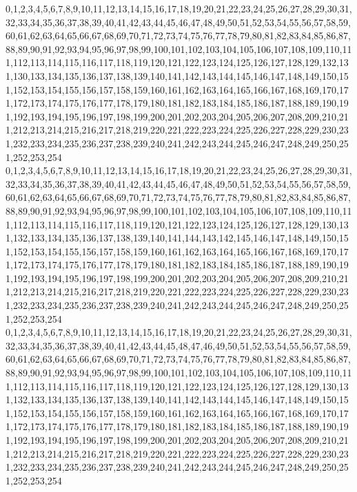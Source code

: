 \documentclass[12pt]{article}
\begin{document}
{0,1,2,3,4,5,6,7,8,9,10,11,12,13,14,15,16,17,18,19,20,21,22,23,24,25,26,27,28,29,30,31,32,33,34,35,36,37,38,39,40,41,42,43,44,45,46,47,48,49,50,51,52,53,54,55,56,57,58,59,60,61,62,63,64,65,66,67,68,69,70,71,72,73,74,75,76,77,78,79,80,81,82,83,84,85,86,87,88,89,90,91,92,93,94,95,96,97,98,99,100,101,102,103,104,105,106,107,108,109,110,111,112,113,114,115,116,117,118,119,120,121,122,123,124,125,126,127,128,129,132,131,130,133,134,135,136,137,138,139,140,141,142,143,144,145,146,147,148,149,150,151,152,153,154,155,156,157,158,159,160,161,162,163,164,165,166,167,168,169,170,171,172,173,174,175,176,177,178,179,180,181,182,183,184,185,186,187,188,189,190,191,192,193,194,195,196,197,198,199,200,201,202,203,204,205,206,207,208,209,210,211,212,213,214,215,216,217,218,219,220,221,222,223,224,225,226,227,228,229,230,231,232,233,234,235,236,237,238,239,240,241,242,243,244,245,246,247,248,249,250,251,252,253,254\\
0,1,2,3,4,5,6,7,8,9,10,11,12,13,14,15,16,17,18,19,20,21,22,23,24,25,26,27,28,29,30,31,32,33,34,35,36,37,38,39,40,41,42,43,44,45,46,47,48,49,50,51,52,53,54,55,56,57,58,59,60,61,62,63,64,65,66,67,68,69,70,71,72,73,74,75,76,77,78,79,80,81,82,83,84,85,86,87,88,89,90,91,92,93,94,95,96,97,98,99,100,101,102,103,104,105,106,107,108,109,110,111,112,113,114,115,116,117,118,119,120,121,122,123,124,125,126,127,128,129,130,131,132,133,134,135,136,137,138,139,140,141,144,143,142,145,146,147,148,149,150,151,152,153,154,155,156,157,158,159,160,161,162,163,164,165,166,167,168,169,170,171,172,173,174,175,176,177,178,179,180,181,182,183,184,185,186,187,188,189,190,191,192,193,194,195,196,197,198,199,200,201,202,203,204,205,206,207,208,209,210,211,212,213,214,215,216,217,218,219,220,221,222,223,224,225,226,227,228,229,230,231,232,233,234,235,236,237,238,239,240,241,242,243,244,245,246,247,248,249,250,251,252,253,254\\
0,1,2,3,4,5,6,7,8,9,10,11,12,13,14,15,16,17,18,19,20,21,22,23,24,25,26,27,28,29,30,31,32,33,34,35,36,37,38,39,40,41,42,43,44,45,48,47,46,49,50,51,52,53,54,55,56,57,58,59,60,61,62,63,64,65,66,67,68,69,70,71,72,73,74,75,76,77,78,79,80,81,82,83,84,85,86,87,88,89,90,91,92,93,94,95,96,97,98,99,100,101,102,103,104,105,106,107,108,109,110,111,112,113,114,115,116,117,118,119,120,121,122,123,124,125,126,127,128,129,130,131,132,133,134,135,136,137,138,139,140,141,142,143,144,145,146,147,148,149,150,151,152,153,154,155,156,157,158,159,160,161,162,163,164,165,166,167,168,169,170,171,172,173,174,175,176,177,178,179,180,181,182,183,184,185,186,187,188,189,190,191,192,193,194,195,196,197,198,199,200,201,202,203,204,205,206,207,208,209,210,211,212,213,214,215,216,217,218,219,220,221,222,223,224,225,226,227,228,229,230,231,232,233,234,235,236,237,238,239,240,241,242,243,244,245,246,247,248,249,250,251,252,253,254\\
}
\end{document}
